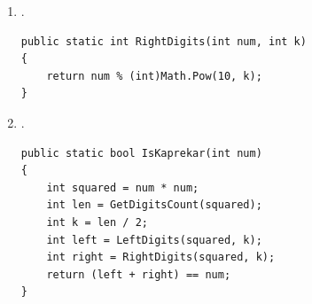 \begin{boxSolution}
\begin{enumerate}[label=\alph*., start=2]

    \item .
\begin{boxCode}
\begin{english}
\begin{verbatim}
public static int RightDigits(int num, int k)
{
    return num % (int)Math.Pow(10, k);
}
\end{verbatim}
\end{english}
\end{boxCode}

    \item .
\begin{boxCode}
\begin{english}
\begin{verbatim}
public static bool IsKaprekar(int num)
{
    int squared = num * num;
    int len = GetDigitsCount(squared);
    int k = len / 2;
    int left = LeftDigits(squared, k);
    int right = RightDigits(squared, k);
    return (left + right) == num;
}
\end{verbatim}
\end{english}
\end{boxCode}

\end{enumerate}
\end{boxSolution}
\clearpage
\fi
